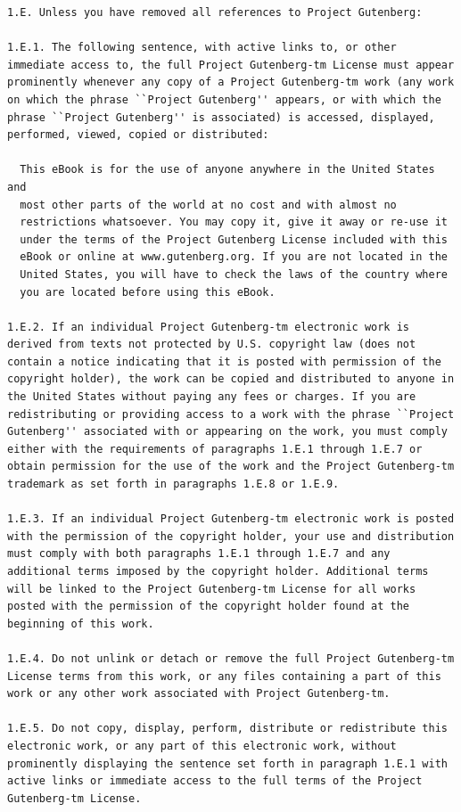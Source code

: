 \documentclass[11pt,oneside]{book}
\begin{document}
\begin{verbatim}
1.E. Unless you have removed all references to Project Gutenberg:

1.E.1. The following sentence, with active links to, or other
immediate access to, the full Project Gutenberg-tm License must appear
prominently whenever any copy of a Project Gutenberg-tm work (any work
on which the phrase ``Project Gutenberg'' appears, or with which the
phrase ``Project Gutenberg'' is associated) is accessed, displayed,
performed, viewed, copied or distributed:

  This eBook is for the use of anyone anywhere in the United States and
  most other parts of the world at no cost and with almost no
  restrictions whatsoever. You may copy it, give it away or re-use it
  under the terms of the Project Gutenberg License included with this
  eBook or online at www.gutenberg.org. If you are not located in the
  United States, you will have to check the laws of the country where
  you are located before using this eBook.

1.E.2. If an individual Project Gutenberg-tm electronic work is
derived from texts not protected by U.S. copyright law (does not
contain a notice indicating that it is posted with permission of the
copyright holder), the work can be copied and distributed to anyone in
the United States without paying any fees or charges. If you are
redistributing or providing access to a work with the phrase ``Project
Gutenberg'' associated with or appearing on the work, you must comply
either with the requirements of paragraphs 1.E.1 through 1.E.7 or
obtain permission for the use of the work and the Project Gutenberg-tm
trademark as set forth in paragraphs 1.E.8 or 1.E.9.

1.E.3. If an individual Project Gutenberg-tm electronic work is posted
with the permission of the copyright holder, your use and distribution
must comply with both paragraphs 1.E.1 through 1.E.7 and any
additional terms imposed by the copyright holder. Additional terms
will be linked to the Project Gutenberg-tm License for all works
posted with the permission of the copyright holder found at the
beginning of this work.

1.E.4. Do not unlink or detach or remove the full Project Gutenberg-tm
License terms from this work, or any files containing a part of this
work or any other work associated with Project Gutenberg-tm.

1.E.5. Do not copy, display, perform, distribute or redistribute this
electronic work, or any part of this electronic work, without
prominently displaying the sentence set forth in paragraph 1.E.1 with
active links or immediate access to the full terms of the Project
Gutenberg-tm License.


\end{verbatim}
\end{document}
